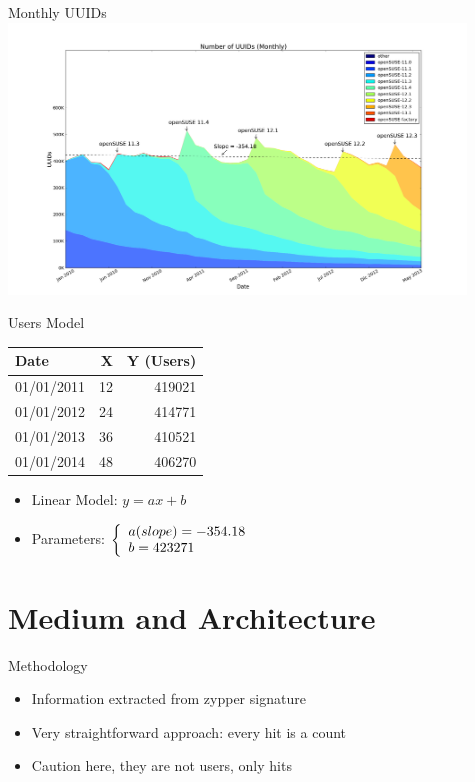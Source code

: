 \documentclass{beamer}
\begin{document}
\begin{frame}{Monthly UUIDs}
  \includegraphics[height=7.2cm]{uuid_month}
\end{frame}

\begin{frame}{Users Model}
  \begin{center}
    \begin{tabular}{l r r}
      \toprule
      Date & X & Y (Users) \\
      \midrule
      01/01/2011 & 12 & 419021 \\
      01/01/2012 & 24 & 414771 \\
      01/01/2013 & 36 & 410521 \\
      01/01/2014 & 48 & 406270 \\
      \bottomrule
    \end{tabular}
  \end{center}
  \begin{itemize}
  \item Linear Model: \(y = ax + b\)
  \item Parameters: \(\left\{
    \begin{array}{l l}
      a (slope) = -354.18 \\
      b = 423271 \\
    \end{array} \right.\)
  \end{itemize}
\end{frame}


\section{Medium and Architecture}

\begin{frame}{Methodology}
  \begin{itemize}
  \item Information extracted from zypper signature
  \item Very straightforward approach: every hit is a count
  \item Caution here, they are not users, only hits
  \end{itemize}
\end{frame}
\end{document}
